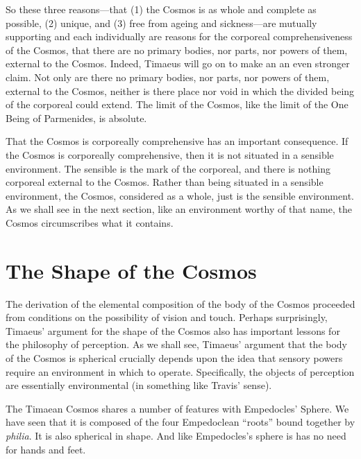 So these three reasons---that (1) the Cosmos is as whole and complete as possible, (2) unique, and (3) free from ageing and sickness---are mutually supporting and each individually are reasons for the corporeal comprehensiveness of the Cosmos, that there are no primary bodies, nor parts, nor powers of them, external to the Cosmos. Indeed, Timaeus will go on to make an an even stronger claim. Not only are there no primary bodies, nor parts, nor powers of them, external to the Cosmos, neither is there place nor void in which the divided being of the corporeal could extend. The limit of the Cosmos, like the limit of the One Being of Parmenides, is absolute.

That the Cosmos is corporeally comprehensive has an important consequence. If the Cosmos is corporeally comprehensive, then it is not situated in a sensible environment. The sensible is the mark of the corporeal, and there is nothing corporeal external to the Cosmos. Rather than being situated in a sensible environment, the Cosmos, considered as a whole, just is the sensible environment. As we shall see in the next section, like an environment worthy of that name, the Cosmos circumscribes what it contains.


\section{The Shape of the Cosmos} %
\label{sec:the_shape_of_the_Cosmos}

The derivation of the elemental composition of the body of the Cosmos proceeded from conditions on the possibility of vision and touch. Perhaps surprisingly, Timaeus' argument for the shape of the Cosmos also has important lessons for the philosophy of perception. As we shall see, Timaeus' argument that the body of the Cosmos is spherical crucially depends upon the idea that sensory powers require an environment in which to operate. Specifically, the objects of perception are essentially environmental (in something like Travis' \citeyear{Travis:2005ys} sense). 

The Timaean Cosmos shares a number of features with Empedocles' Sphere. We have seen that it is composed of the four Empedoclean ``roots'' bound together by \emph{philia}. It is also spherical in shape. And like Empedocles's sphere is has no need for hands and feet.


